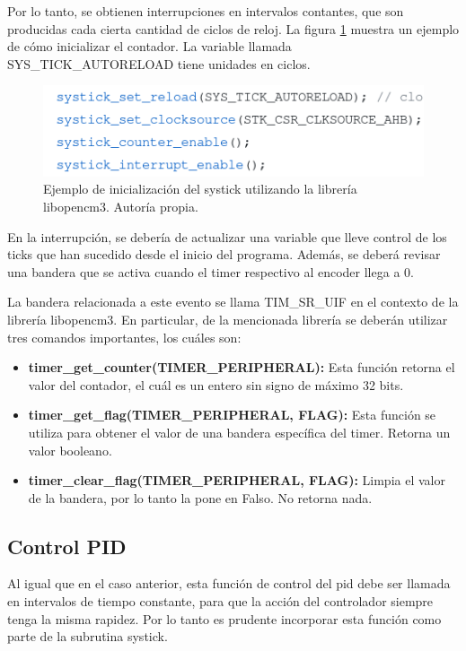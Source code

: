 Por lo tanto, se obtienen interrupciones en intervalos contantes, que son producidas cada cierta cantidad de ciclos de reloj. La figura \ref{F:systick} muestra un ejemplo de cómo inicializar el contador. La variable llamada SYS\_TICK\_AUTORELOAD tiene unidades en ciclos.

\begin{figure}[H]
\centering
\includegraphics[scale=0.5]{imagenes/systick.png}
\caption{Ejemplo de inicialización del systick utilizando la librería libopencm3. Autoría propia.}
\label{F:systick}
\end{figure}

En la interrupción, se debería de actualizar una variable que lleve control de los ticks que han sucedido desde el inicio del programa. Además, se deberá revisar una bandera que se activa cuando el timer respectivo al encoder llega a 0.

La bandera relacionada a este evento se llama TIM\_SR\_UIF en el contexto de la librería libopencm3. En particular, de la mencionada librería se deberán utilizar tres comandos importantes, los cuáles son:

\begin{itemize}
\item \textbf{timer\_get\_counter(TIMER\_PERIPHERAL):} Esta función retorna el valor del contador, el cuál es un entero sin signo de máximo 32 bits.

\item \textbf{timer\_get\_flag(TIMER\_PERIPHERAL, FLAG):} Esta función se utiliza para obtener el valor de una bandera específica del timer. Retorna un valor booleano.

\item \textbf{timer\_clear\_flag(TIMER\_PERIPHERAL, FLAG):} Limpia el valor de la bandera, por lo tanto la pone en Falso. No retorna nada.
\end{itemize}

\subsection{Control PID}

Al igual que en el caso anterior, esta función de control del pid debe ser llamada en intervalos de tiempo constante, para que la acción del controlador siempre tenga la misma rapidez. Por lo tanto es prudente incorporar esta función como parte de la subrutina systick.

